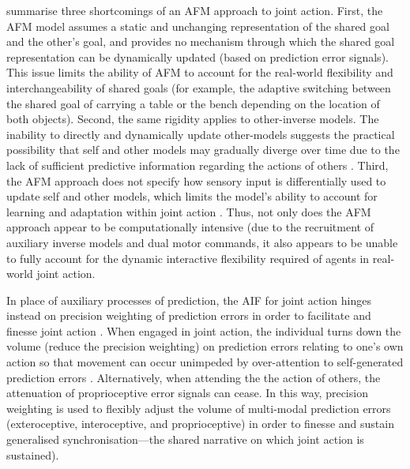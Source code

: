 \begin{CJK}{UTF8}{gbsn}
\textcite{Pesquita2017} summarise three shortcomings of an AFM approach to joint action.  First, the AFM model assumes a static and unchanging representation of the shared goal and the other's goal, and provides no mechanism through which the shared goal representation can be dynamically updated (based on prediction error signals).  This issue limits the ability of AFM to account for the real-world flexibility and interchangeability of shared goals (for example, the adaptive switching between the shared goal of carrying a table or the bench depending on the location of both objects).  Second, the same rigidity applies to other-inverse models.  The inability to directly and dynamically update other-models suggests the practical possibility that self and other models may gradually diverge over time due to the lack of sufficient predictive information regarding the actions of others \citep{Pickering2014}. Third, the AFM approach does not specify how sensory input is differentially used to update self and other models, which limits the model's ability to account for learning and adaptation within joint action \citep{Pesquita2017}.  Thus, not only does the AFM approach appear to be computationally intensive (due to the recruitment of auxiliary inverse models and dual motor commands, it also appears to be unable to fully account for the dynamic interactive flexibility required of agents in real-world joint action.


In place of auxiliary processes of prediction, the AIF for joint action hinges instead on precision weighting of prediction errors in order to facilitate and finesse joint action \citep{Friston2015,Friston2015a}.  When engaged in joint action, the individual turns down the volume (reduce the precision weighting) on prediction errors relating to one's own action so that movement can occur unimpeded by over-attention to self-generated prediction errors \citep[an intuitive example of the opposite of this ideal scenario is a Skype call in which the flow of an individual's speech is interrupted by auditory feedback from the other receiver's device (feedback that would otherwise be attenuated by the speaker), see][]{Friston2015}.  Alternatively, when attending the the action of others, the attenuation of proprioceptive error signals can cease. In this way, precision weighting is used to flexibly adjust the volume of multi-modal prediction errors (exteroceptive, interoceptive, and proprioceptive) in order to finesse and sustain generalised synchronisation---the shared narrative on which joint action is sustained).


\end{CJK}
